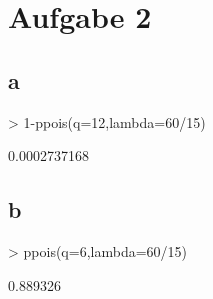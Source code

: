 

\section{Aufgabe 2}

\subsection{a}
\begin{Schunk}
\begin{Sinput}
> 1-ppois(q=12,lambda=60/15)
\end{Sinput}
\begin{Soutput}
[1] 0.0002737168
\end{Soutput}
\end{Schunk}

\subsection{b}
\begin{Schunk}
\begin{Sinput}
> ppois(q=6,lambda=60/15)
\end{Sinput}
\begin{Soutput}
[1] 0.889326
\end{Soutput}
\end{Schunk}
